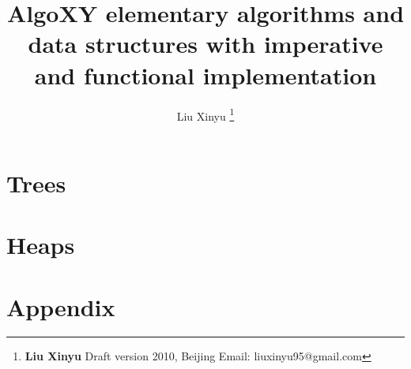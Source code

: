 \documentclass[a4paper,twoside]{book} %
\begin{document}


\title{{\bf \Huge AlgoXY} elementary algorithms and data structures \newline
            with imperative and functional implementation \newline
            \newline
            }

\author{Liu Xinyu
  \thanks{{\bfseries Liu Xinyu } \newline
    Draft version 2010, Beijing \newline
    Email: liuxinyu95@gmail.com \newline
    }}

\maketitle


\tableofcontents
\newpage



\part{Trees}














\part{Heaps}




\part{Appendix}


\printindex
\end{document}
